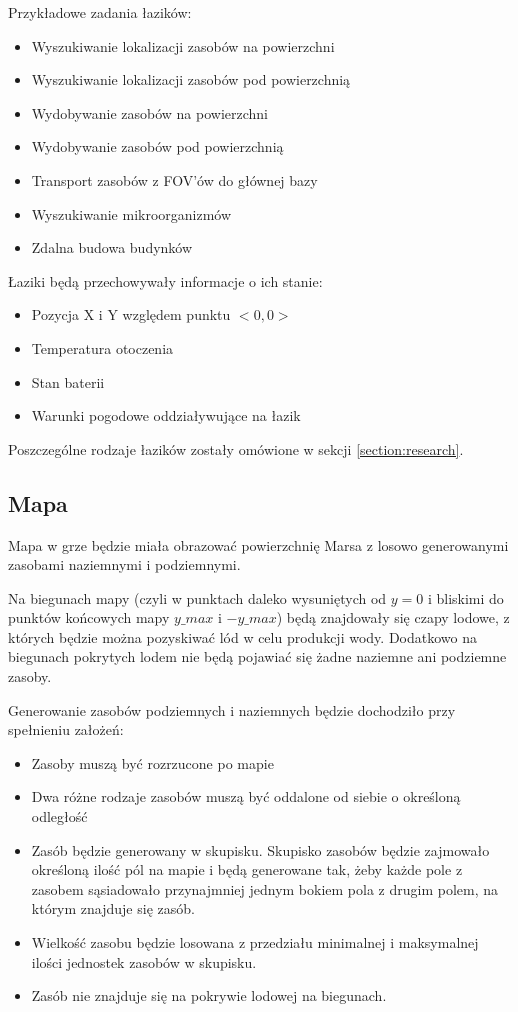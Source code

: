 \documentclass[a4paper,12pt]{article}
\begin{document}
Przykładowe zadania łazików:
\begin{itemize}
	\item Wyszukiwanie lokalizacji zasobów na powierzchni
	\item Wyszukiwanie lokalizacji zasobów pod powierzchnią
	\item Wydobywanie zasobów na powierzchni
	\item Wydobywanie zasobów pod powierzchnią
	\item Transport zasobów z FOV'ów do głównej bazy
	\item Wyszukiwanie mikroorganizmów
	\item Zdalna budowa budynków
\end{itemize}

Łaziki będą przechowywały informacje o ich stanie:
\begin{itemize}
	\item Pozycja X i Y względem punktu $<0,0>$
	\item Temperatura otoczenia
	\item Stan baterii
	\item Warunki pogodowe oddziaływujące na łazik
\end{itemize}

Poszczególne rodzaje łazików zostały omówione w sekcji \ref{section:research}.
\subsection{Mapa}
Mapa w grze będzie miała obrazować powierzchnię Marsa z losowo generowanymi zasobami naziemnymi i podziemnymi. 

Na biegunach mapy (czyli w punktach daleko wysuniętych od $y = 0$ i bliskimi do punktów końcowych mapy $y\_max$ i $-y\_max$) będą znajdowały się czapy lodowe, z których będzie można pozyskiwać lód w celu produkcji wody. Dodatkowo na biegunach pokrytych lodem nie będą pojawiać się żadne naziemne ani podziemne zasoby.

Generowanie zasobów podziemnych i naziemnych będzie dochodziło przy spełnieniu założeń:
\begin{itemize}
	\item Zasoby muszą być rozrzucone po mapie
	\item Dwa różne rodzaje zasobów muszą być oddalone od siebie o określoną odległość
	\item Zasób będzie generowany w skupisku. Skupisko zasobów będzie zajmowało określoną ilość pól na mapie i będą generowane tak, żeby każde pole z zasobem sąsiadowało przynajmniej jednym bokiem pola z drugim polem, na którym znajduje się zasób. 
	\item Wielkość zasobu będzie losowana z przedziału minimalnej i maksymalnej ilości jednostek zasobów w skupisku.
	\item Zasób nie znajduje się na pokrywie lodowej na biegunach.
\end{itemize}
\end{document}
